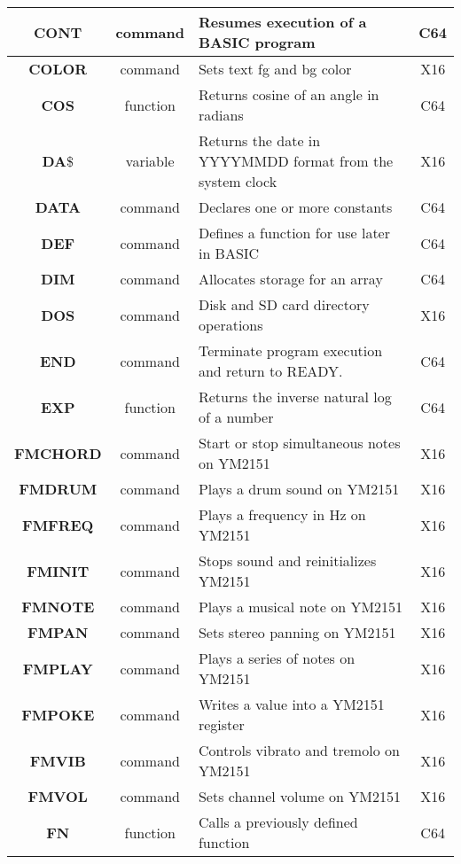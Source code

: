 \begin{longtable}{|c|c|m{4cm}|c|}
	{\bfseries CONT} & command & Resumes execution of a BASIC program & C64 \\ \hline
	{\bfseries COLOR} & command & Sets text fg and bg color & X16 \\ \hline
	{\bfseries COS} & function & Returns cosine of an angle in radians & C64 \\ \hline
	{\bfseries DA}\$ & variable & Returns the date in YYYYMMDD format from the system clock & X16 \\ \hline
	{\bfseries DATA} & command & Declares one or more constants & C64 \\ \hline
	{\bfseries DEF} & command & Defines a function for use later in BASIC & C64 \\ \hline
	{\bfseries DIM} & command & Allocates storage for an array & C64 \\ \hline
	{\bfseries DOS} & command & Disk and SD card directory operations & X16 \\ \hline
	{\bfseries END} & command & Terminate program execution and return to {\ttfamily READY.} & C64 \\ \hline
	{\bfseries EXP} & function & Returns the inverse natural log of a number & C64 \\ \hline
	{\bfseries FMCHORD} & command & Start or stop simultaneous notes on YM2151 & X16 \\ \hline
	{\bfseries FMDRUM} & command & Plays a drum sound on YM2151 & X16 \\ \hline
	{\bfseries FMFREQ} & command & Plays a frequency in Hz on YM2151 & X16 \\ \hline
	{\bfseries FMINIT} & command & Stops sound and reinitializes YM2151 & X16 \\ \hline
	{\bfseries FMNOTE} & command & Plays a musical note on YM2151 & X16 \\ \hline
	{\bfseries FMPAN} & command & Sets stereo panning on YM2151 & X16 \\ \hline
	{\bfseries FMPLAY} & command & Plays a series of notes on YM2151 & X16 \\ \hline
	{\bfseries FMPOKE} & command & Writes a value into a YM2151 register & X16 \\ \hline
	{\bfseries FMVIB} & command & Controls vibrato and tremolo on YM2151 & X16 \\ \hline
	{\bfseries FMVOL} & command & Sets channel volume on YM2151 & X16 \\ \hline
	{\bfseries FN} & function & Calls a previously defined function & C64 \\ \hline

\end{longtable}
